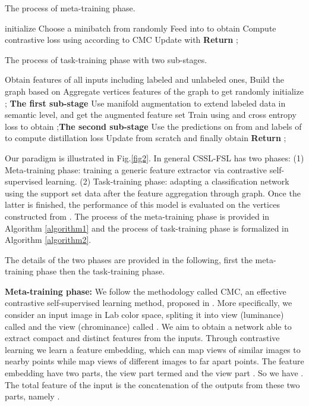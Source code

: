 \documentclass[conference]{IEEEtran}
\begin{document}
\begin{algorithm}[ht]
\caption{The process of meta-training phase.}
\label{algorithm1}
initialize  \;
{
Choose a minibatch  from  randomly\;
Feed  into  to obtain \;
Compute contrastive loss  using  according to CMC \cite{tian2019contrastive}\;
Update  with \;
}
\textbf{Return} ;

\end{algorithm}



\begin{algorithm}[ht]
\caption{The process of task-training phase with two sub-stages.}
\label{algorithm2}
Obtain features of all inputs including labeled and unlabeled ones, \;
Build the graph  based on \;
Aggregate vertices features  of the graph to get \;
randomly initialize ; \qquad\qquad\qquad\qquad\qquad\qquad\textbf{The first sub-stage}\;
Use manifold augmentation to extend labeled data in semantic level, and get the augmented feature set \;
Train  using  and cross entropy loss to obtain ;\qquad\qquad\qquad\qquad\qquad\qquad\qquad\qquad\textbf{The second sub-stage}\;
Use the predictions on  from  and labels of  to compute distillation loss\;
Update  from scratch and finally obtain \;
\textbf{Return} ;


\end{algorithm}



Our paradigm is illustrated in Fig.\ref{fig2}. In general CSSL-FSL has two phases: (1) Meta-training phase: training a generic feature extractor via contrastive self-supervised learning. (2) Task-training phase: adapting a classification network using the support set data after the feature aggregation through graph. Once the latter is finished, the performance of this model is evaluated on the vertices constructed from . The process of the meta-training phase is provided in Algorithm \ref{algorithm1} and the process of task-training phase is formalized in Algorithm \ref{algorithm2}.


The details of the two phases are provided in the following, ﬁrst the meta-training phase then the task-training phase.


\textbf{Meta-training phase:} We follow the methodology called CMC, an effective contrastive self-supervised learning method, proposed in \cite{tian2019contrastive}. More specifically, we consider an input image in Lab color space, spliting it into  view (luminance) called  and the  view (chrominance) called . We aim to obtain a network able to extract compact and distinct features from the inputs. Through contrastive learning we learn a feature embedding, which can map views of similar images to nearby points while map views of different images to far apart points. The feature embedding have two parts, the  view part termed  and the  view part . So we have . The total feature of the input is the concatenation of the outputs from these two parts, namely . 
\end{document}
